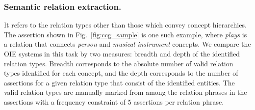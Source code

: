 \documentclass{llncs}
\begin{document}
\subsubsection{Semantic relation extraction.} It refers to the relation types other than those which convey concept hierarchies. The assertion shown in Fig.~\ref{fig:ccg_sample} is one such example, where \textit{plays} is a relation that connects \textit{person} and \textit{musical instrument} concepts. We compare the OIE systems in this task by two measures: breadth and depth of the identified relation types. Breadth corresponds to the absolute number of valid relation types identified for each concept, and the depth corresponds to the number of assertions for a given relation type that consist of the identified entities. The valid relation types are manually marked from among the relation phrases in the assertions with a frequency constraint of 5 assertions per relation phrase.
\end{document}
